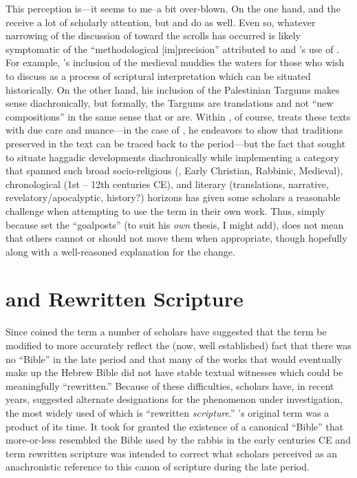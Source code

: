 This perception is---it seems to me--a bit over-blown. On the one hand,
\ga and the \templescroll receive a lot
of scholarly attention, but \jub and
\ant do as well. Even so, whatever narrowing of the
discussion of \rwb toward the \qumran
scrolls has occurred is likely symptomatic of the ``methodological
{[}im{]}precision'' attributed to  and
\vermes's use of \rwB. For example,
\vermes's inclusion of the medieval
\sefer muddies the waters for those who wish to discuss
\rwb as a process of scriptural interpretation which can
be situated historically. On the other hand, his inclusion of the
Palestinian Targums makes sense diachronically, but formally, the
Targums are translations and not ``new compositions'' in the same sense
that \jub or \ga are. Within
, of course, \vermes treats these
texts with due care and nuance---in the case of \sefer,
he endeavors to show that traditions preserved in the text can be traced
back to the \secondtemple period---but the fact that
\vermes sought to situate haggadic developments
diachronically while implementing a category that spanned such broad
socio-religious (\qumran, Early Christian, Rabbinic,
Medieval), chronological (1st -- 12th centuries CE), and literary
(translations, narrative, revelatory/apocalyptic, history?) horizons has
given some scholars a reasonable challenge when attempting to use the
term in their own work. Thus, simply because \vermes set
the ``goalposts'' (to suit his \emph{own} thesis, I might add), does not
mean that others cannot or should not move them when appropriate, though
hopefully along with a well-reasoned explanation for the change.

\hypertarget{rwb-and-rewritten-scripture}{%
\section{\RWB and Rewritten
Scripture}\label{rwb-and-rewritten-scripture}}

Since \vermes coined the term \rwb a
number of scholars have suggested that the term be modified to more
accurately reflect the (now, well established) fact that there was no
``Bible'' in the late \secondtemple period and that many of the
works that would eventually make up the Hebrew Bible did not have stable
textual witnesses which could be meaningfully ``rewritten.'' Because of
these difficulties, scholars have, in recent years, suggested alternate
designations for the phenomenon under investigation, the most widely
used of which is ``rewritten \emph{scripture}.''
\vermes's original term \rwb was a
product of its time. It took for granted the existence of a canonical
``Bible'' that more-or-less resembled the Bible used by the rabbis in
the early centuries CE and term rewritten scripture was intended to
correct what scholars perceived as an anachronistic reference to this
canon of scripture during the late \secondtemple
period.\autocites[58--59]{campbell_zsengeller2014}[See
also][]{ulrich_mcdonald-sanders2002}[and][]{ulrich_zsengeller2014}


